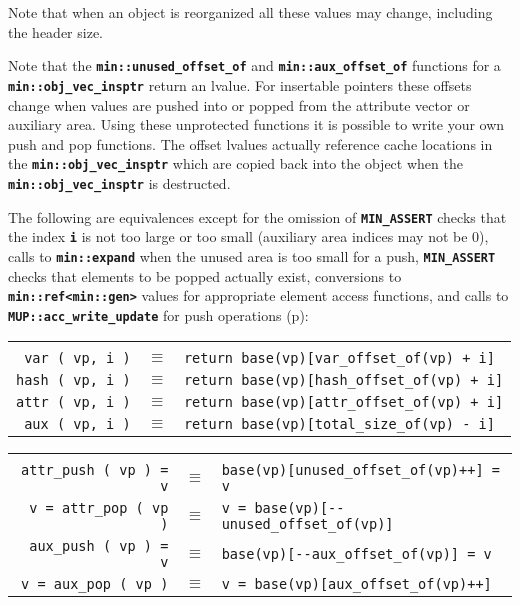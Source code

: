 \documentclass[12pt]{article}
\newcommand{\TT}[1]{{\tt \bfseries #1}}
\newcommand{\pagref}[1]{p\pageref{#1}}
\newcommand{\EOL}{\penalty \exhyphenpenalty}
\newenvironment{indpar}[1][0.3in]%
	{\begin{list}{}%
		     {\setlength{\itemsep}{0in}%
		      \setlength{\topsep}{0in}%
		      \setlength{\parsep}{1ex}%
		      \setlength{\labelwidth}{#1}%
		      \setlength{\leftmargin}{#1}%
		      \addtolength{\leftmargin}{\labelsep}}%
	 \item}%
	{\end{list}}
\begin{document}
Note that when an object is reorganized all these values may
change, including the header size.

Note that the \TT{min::\EOL unused\_\EOL offset\_\EOL of} and
\TT{min::\EOL aux\_\EOL offset\_\EOL of} functions for a
\TT{min::\EOL obj\_\EOL vec\_\EOL insptr} return an
lvalue.  For insertable pointers these offsets change when
values are pushed into or popped from the attribute vector or
auxiliary area.  Using these unprotected functions it is possible
to write your own push and pop functions.  The offset lvalues
actually reference cache locations in the
\TT{min::\EOL obj\_\EOL vec\_\EOL insptr} which are copied
back into the object when the 
\TT{min::\EOL obj\_\EOL vec\_\EOL insptr} is destructed.

The following are equivalences except for
the omission of \TT{MIN\_\EOL ASSERT} checks that the index \TT{i}
is not too large or too small (auxiliary area indices may not be 0),
calls to \TT{min::\EOL expand} when the unused area is too small
for a push, \TT{MIN\_\EOL ASSERT} checks that elements to be popped
actually exist,
conversions to \TT{min::ref<min::gen>}
values for appropriate element access functions, and
calls to \TT{MUP::\EOL acc\_\EOL write\_\EOL update}
for push operations
(\pagref{MUP::ACC_WRITE_GEN_UPDATE}):

\begin{indpar}\begin{tabular}{rcl}
\hspace*{2.0in} \\[-3ex]
\verb|var ( vp, i )| & $\equiv$
    & \verb|return base(vp)[var_offset_of(vp) + i]| \\
\verb|hash ( vp, i )| & $\equiv$
    & \verb|return base(vp)[hash_offset_of(vp) + i]| \\
\verb|attr ( vp, i )| & $\equiv$
    & \verb|return base(vp)[attr_offset_of(vp) + i]| \\
\verb|aux ( vp, i )| & $\equiv$
    & \verb|return base(vp)[total_size_of(vp) - i]| \\
\end{tabular}\end{indpar}\label{OBJECT-VECTOR-EQUIVALENTS}
\begin{indpar}\begin{tabular}{rcl}
\hspace*{2.0in} \\[-3ex]
\verb|attr_push ( vp ) = v| & $\equiv$
    & \verb|base(vp)[unused_offset_of(vp)++] = v| \\
\verb|v = attr_pop ( vp )| & $\equiv$
    & \verb|v = base(vp)[--unused_offset_of(vp)]| \\
\verb|aux_push ( vp ) = v| & $\equiv$
    & \verb|base(vp)[--aux_offset_of(vp)] = v| \\
\verb|v = aux_pop ( vp )| & $\equiv$
    & \verb|v = base(vp)[aux_offset_of(vp)++]| \\
\end{tabular}\end{indpar}
\end{document}

